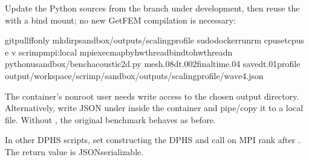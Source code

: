 \documentclass[letterpaper,10pt,english]{sphinxmanual}
\begin{document}
\sphinxAtStartPar
Update the Python sources from the branch under development, then
reuse the  with a bind mount; no new
GetFEM compilation is necessary:

\begin{sphinxVerbatim}[commandchars=\\\{\}]
gitpull\PYGZhy{}\PYGZhy{}ff\PYGZhy{}only
mkdir\PYGZhy{}psandbox/outputs/scaling\PYGZhy{}profile
sudodockerrun\PYGZhy{}\PYGZhy{}rm
\PYGZhy{}\PYGZhy{}cpuset\PYGZhy{}cpus
\PYGZhy{}e
\PYGZhy{}v
scrimp\PYGZhy{}mpi:local
mpiexec\PYGZhy{}\PYGZhy{}map\PYGZhy{}byhwthread\PYGZhy{}\PYGZhy{}bind\PYGZhy{}tohwthread\PYGZhy{}n
python\PYGZhy{}usandbox/bench\PYGZus{}acoustic\PYGZus{}2d.py
\PYGZhy{}\PYGZhy{}mesh.08\PYGZhy{}\PYGZhy{}dt.002\PYGZhy{}\PYGZhy{}final\PYGZhy{}time.04
\PYGZhy{}\PYGZhy{}save\PYGZhy{}dt.01\PYGZhy{}\PYGZhy{}profile
\PYGZhy{}\PYGZhy{}output/workspace/scrimp/sandbox/outputs/scaling\PYGZhy{}profile/wave\PYGZus{}4.json
\end{sphinxVerbatim}

\sphinxAtStartPar
The container’s non\sphinxhyphen{}root user needs write access to the chosen output
directory. Alternatively, write JSON under  inside the
container and pipe/copy it to a local file. Without ,
the original benchmark behaves as before.

\sphinxAtStartPar
In other DPHS scripts, set   constructing
the DPHS and call  on  MPI rank
after . The return value is JSON\sphinxhyphen{}serializable.
\end{document}

